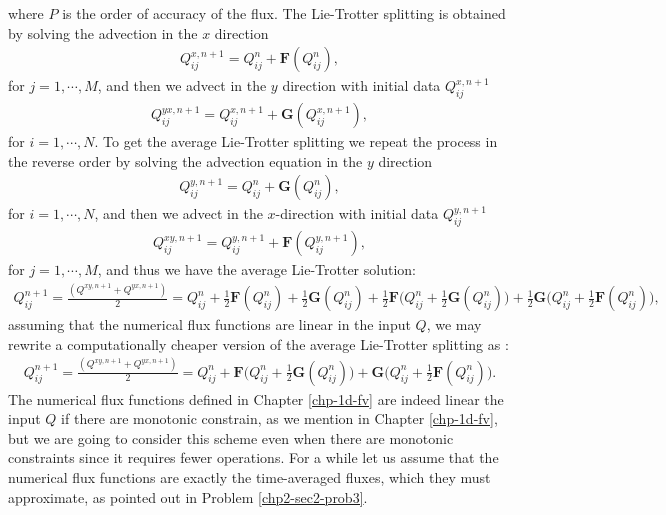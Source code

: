 where $P$ is the order of accuracy of the flux.
The Lie-Trotter splitting is obtained by solving the advection in the $x$ direction
\begin{align*}
	{Q}_{ij}^{x,n+1} =  {Q}_{ij}^{n} + \mathbf{F}({Q_{ij}^n}),
\end{align*}
for $j=1, \cdots, M$, and then we advect in the $y$ direction with initial data ${Q}_{ij}^{x,n+1}$ 
\begin{align*}
	{Q}_{ij}^{yx,n+1} = Q_{ij}^{x,n+1} + \mathbf{G}({Q_{ij}^{x,n+1}}),
\end{align*}
for $i=1, \cdots, N$.
To get the average Lie-Trotter splitting we repeat the process in the reverse order by solving the advection equation
in the $y$ direction
\begin{align*}
	{Q}_{ij}^{y,n+1} =  {Q}_{ij}^{n} + \mathbf{G}({Q_{ij}^n}),
\end{align*}
for $i=1, \cdots, N$, and then we advect in the $x$-direction with initial data ${Q}_{ij}^{y,n+1}$ 
\begin{align*}
	{Q}_{ij}^{xy,n+1} = Q_{ij}^{y,n+1} + \mathbf{F}({Q_{ij}^{y,n+1}}),
\end{align*}
for $j=1, \cdots, M$, and thus we have the average Lie-Trotter solution:
\begin{align*}
	Q^{n+1}_{ij} = \frac{(Q^{xy,n+1} + Q^{yx,n+1})}{2} = Q_{ij}^n + \frac{1}{2}\mathbf{F}(Q_{ij}^n) + \frac{1}{2}\mathbf{G}(Q_{ij}^n) + \frac{1}{2}\mathbf{F}\bigg(Q_{ij}^n + \frac{1}{2}\mathbf{G}(Q_{ij}^n)\bigg) + \frac{1}{2}\mathbf{G}\bigg(Q_{ij}^n + \frac{1}{2}\mathbf{F}(Q_{ij}^n)\bigg),
\end{align*}
assuming that the numerical flux functions are linear in the input $Q$, we may rewrite a computationally cheaper version
of the average Lie-Trotter splitting as \citep{lin:1996}:
\begin{align}
	\label{chp3-avlt}
	Q^{n+1}_{ij} = \frac{(Q^{xy,n+1} + Q^{yx,n+1})}{2} = Q_{ij}^n +  
	\mathbf{F}\bigg(Q_{ij}^n + \frac{1}{2}\mathbf{G}(Q_{ij}^n)\bigg) +  
	\mathbf{G}\bigg(Q_{ij}^n + \frac{1}{2}\mathbf{F}(Q_{ij}^n)\bigg).
\end{align}
The numerical flux functions defined in Chapter \ref{chp-1d-fv} are indeed linear the input $Q$ if there are monotonic constrain, 
as we mention in Chapter \ref{chp-1d-fv}, but we are going to consider this scheme even when there are monotonic constraints since it requires fewer operations.
For a while let us assume that the numerical flux functions are exactly the time-averaged fluxes, which they must approximate, as pointed out in Problem \ref{chp2-sec2-prob3}. 
